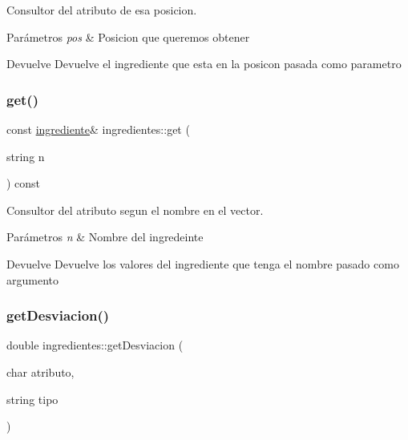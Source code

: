 Consultor del atributo de esa posicion. 


\begin{DoxyParams}{Parámetros}
{\em pos} & Posicion que queremos obtener \\
\hline
\end{DoxyParams}
\begin{DoxyReturn}{Devuelve}
Devuelve el ingrediente que esta en la posicon pasada como parametro 
\end{DoxyReturn}
\mbox{\label{classingredientes_aae670bf5dc762313dff281c7c6aa1b4f}} 
\subsubsection{\texorpdfstring{get()}{get()}\hspace{0.1cm}{\footnotesize\ttfamily [2/2]}}
{\footnotesize\ttfamily const \hyperlink{classingrediente}{ingrediente}\& ingredientes\+::get (\begin{DoxyParamCaption}\item[{string}]{n }\end{DoxyParamCaption}) const}



Consultor del atributo segun el nombre en el vector. 


\begin{DoxyParams}{Parámetros}
{\em n} & Nombre del ingredeinte \\
\hline
\end{DoxyParams}
\begin{DoxyReturn}{Devuelve}
Devuelve los valores del ingrediente que tenga el nombre pasado como argumento 
\end{DoxyReturn}
\mbox{\label{classingredientes_adc3f70ae78a02993e6a4b8dac6a4ba07}} 
\subsubsection{\texorpdfstring{get\+Desviacion()}{getDesviacion()}}
{\footnotesize\ttfamily double ingredientes\+::get\+Desviacion (\begin{DoxyParamCaption}\item[{char}]{atributo,  }\item[{string}]{tipo }\end{DoxyParamCaption})}



